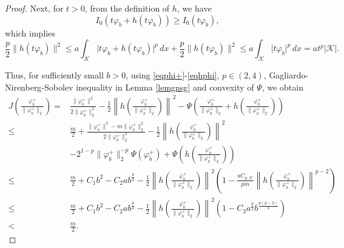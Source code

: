 \documentclass[11pt]{amsart}
\newcommand{\abs}[1]{\lvert#1\rvert}
\newcommand{\norm}[1]{\lVert#1\rVert}
\newcommand{\K}{\mathcal{K}}
\numberwithin{equation}{section}
\begin{document}
\begin{proof}
Next, for $t > 0$, from the definition of $h$, we have
$$
I_0(t\varphi_b+h(t\varphi_b)) \geq I_0(t\varphi_b),
$$
which implies
\begin{equation}\label{eqhphi}
    \frac{p}{2}\norm{h(t\varphi_b)}^{2} \leq a\int_{\K}\abs{t\varphi_b+h(t\varphi_b)}^{p}\,dx + \frac{p}{2}\norm{h(t\varphi_b)}^{2} \leq a\int_{\K}\abs{t\varphi_b}^{p} \,dx = a t^p\abs{\K}.
\end{equation}


Thus, for sufficiently small $b>0$, using \eqref{eqphi+}-\eqref{eqhphi}, $p \in (2,4)$, Gagliardo-Nirenberg-Sobolev inequality in Lemma \ref{lemgnsg} and convexity of $\Psi$, we obtain
    \begin{equation}\label{eqjsmallm}
            \begin{aligned}
                J(\frac{\varphi_b^+}{\norm{\varphi_b^+}_2}) =& \frac{\norm{\varphi_b^+}^2}{2\norm{\varphi_b^+}^2_2}-\frac{1}{2}\left\lVert h\left(\frac{\varphi_b^+}{\norm{\varphi_b^+}_2}\right) \right\rVert^2 - \Psi\left(\frac{\varphi_b^+}{\norm{\varphi_b^+}_2}+h\left(\frac{\varphi_b^+}{\norm{\varphi_b^+}_2}\right)\right)\\
                \leq& \frac{m}{2} + \frac{\norm{\varphi_b^+}^2 - m\norm{\varphi_b^+}^2_2}{2\norm{\varphi_b^+}^2_2}   -\frac{1}{2}\left\lVert h\left(\frac{\varphi_b^+}{\norm{\varphi_b^+}_2}\right) \right\rVert^2\\
                & - 2^{1-p}\norm{\varphi_b^+}_2^{-p}\Psi(\varphi_b^+) +  \Psi\left(h\left(\frac{\varphi_b^+}{\norm{\varphi_b^+}_2}\right)\right)\\
                \leq& \frac{m}{2} + C_1b^2 - C_2ab^\frac{p}{2} - \frac{1}{2}\left\lVert h\left(\frac{\varphi_b^+}{\norm{\varphi_b^+}_2}\right)\right\rVert^2\left(1 - \frac{aC_{p,\K}}{pm}\left\lVert h\left(\frac{\varphi_b^+}{\norm{\varphi_b^+}_2}\right) \right\rVert^{p-2}\right) \\
                \leq& \frac{m}{2} + C_1b^2 - C_2ab^\frac{p}{2} - \frac{1}{2}\left\lVert h\left(\frac{\varphi_b^+}{\norm{\varphi_b^+}_2}\right)\right\rVert^2(1 - C_3 a^\frac{p}{2}b^\frac{p(p-2)}{4})\\
                <& \frac{m}{2}.
    \end{aligned}
    \end{equation}


\end{proof}
\end{document}
